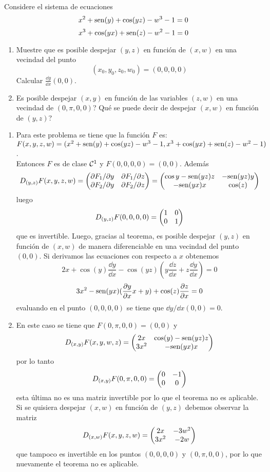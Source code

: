 \begin{ejemplo}
Considere el sistema de ecuaciones
\[x^2+\text{sen} (y)+\cos(yz)-w^3-1=0\]
\[x^3+\cos(yx)+\text{sen}(z)-w^2-1=0\]
\begin{enumerate}
\item Muestre que es posible despejar $(y,z)$ en funci\'on de $(x,w)$
en una vecindad del punto $$(x_0,y_0,z_0,w_0)=(0,0,0,0)$$
Calcular $\frac{\dd y}{\dd x}(0,0)$.
\item {\textquestiondown}Es posible despejar $(x,y)$ en
funci\'on de las variables $(z,w)$ en una vecindad de
$(0,\pi,0,0)$? {\textquestiondown}Qu\'e se puede decir de despejar $(x,w)$ en funci\'on
de $(y,z)$?
\end{enumerate}

\begin{solucion}
\begin{enumerate}
\item Para este problema se tiene que
la funci\'on $F$ es:
\\$F(x,y,z,w)=(x^2+\text{sen} (y)+\cos(yz)-w^3-1,
x^3+\cos(yx)+\text{sen}(z)-w^2-1)$.
\\Entonces $F$ es de clase ${\cal{C}}^1$ y
$F(0,0,0,0)=(0,0)$. Adem\'as
\[D_{(y,z)}F(x,y,z,w)=\begin{pmatrix}\partial F_1/\partial y & \partial
F_1/\partial z \cr \partial F_2/\partial y & \partial F_2/\partial z \cr\end{pmatrix}=\begin{pmatrix}\cos
y-\text{sen} (yz)z & -\text{sen}(yz)y \cr -\text{sen}(yx)x & \cos(z) \cr\end{pmatrix}\] 
luego
\[D_{(y,z)}F(0,0,0,0)=\begin{pmatrix}1 & 0\cr 0 & 1\cr\end{pmatrix}\]
que es invertible. Luego, gracias al teorema, es posible despejar
$(y,z)$ en funci\'on de $(x,w)$ de manera diferenciable en una
vecindad del punto $(0,0)$. Si derivamos las ecuaciones con
respecto a $x$ obtenemos
\[2x+\cos(y)\frac{\dd y}{\dd x}-\cos(yz)(y\frac{\dd z}{\dd
x}+z\frac{\dd y}{\dd x})=0\]
\[3x^2-\text{sen}(yx)(\frac{\partial y}{\partial x}x+y)+\cos(z)\frac{\partial z}{\partial
x}=0\]
evaluando en el punto $(0,0,0,0)$ se tiene que $\dd y/\dd
x(0,0)=0$.

\item En este caso se tiene que $F(0,\pi,0,0)=(0,0)$ y
\[D_{(x,y)}F(x,y,w,z)=\begin{pmatrix}2x & \cos(y)-\text{sen}(yz)z \cr 3x^2 &
-\text{sen}(yx)x \cr\end{pmatrix}
\]
por lo tanto
\[D_{(x,y)}F(0,\pi,0,0)=\begin{pmatrix}0 & -1 \cr 0 & 0\cr\end{pmatrix}
\]
esta \'ultima no es una matriz invertible por lo que el teorema no
es aplicable. Si se quisiera despejar $(x,w)$ en funci\'on de
$(y,z)$ debemos observar la matriz
\[D_{(x,w)}F(x,y,z,w)=\begin{pmatrix}2x & -3w^2 \cr 3x^2 & -2w \cr\end{pmatrix}
\]
que tampoco es invertible en los puntos $(0,0,0,0)$ y
$(0,\pi,0,0)$, por lo que nuevamente el teorema no es
aplicable.
\end{enumerate}
\end{solucion}
\end{ejemplo}

